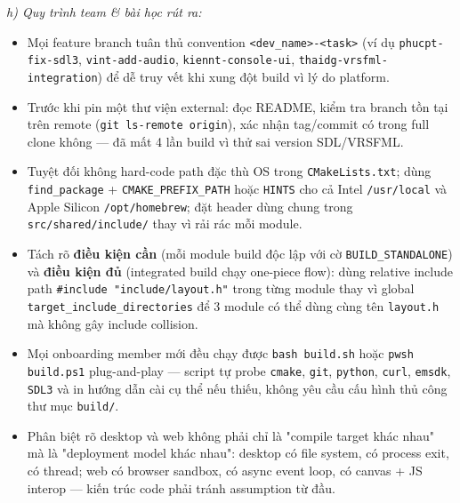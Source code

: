 \documentclass[12pt,a4paper]{article}
\begin{document}
\textit{h) Quy trình team \& bài học rút ra:}
\begin{itemize}
    \item Mọi feature branch tuân thủ convention \texttt{<dev\_name>-<task>} (ví dụ \texttt{phucpt-fix-sdl3}, \texttt{vint-add-audio}, \texttt{kiennt-console-ui}, \texttt{thaidg-vrsfml-integration}) để dễ truy vết khi xung đột build vì lý do platform.
    \item Trước khi pin một thư viện external: đọc README, kiểm tra branch tồn tại trên remote (\texttt{git ls-remote origin}), xác nhận tag/commit có trong full clone không — đã mất 4 lần build vì thử sai version SDL/VRSFML.
    \item Tuyệt đối không hard-code path đặc thù OS trong \texttt{CMakeLists.txt}; dùng \texttt{find\_package} + \texttt{CMAKE\_PREFIX\_PATH} hoặc \texttt{HINTS} cho cả Intel \texttt{/usr/local} và Apple Silicon \texttt{/opt/homebrew}; đặt header dùng chung trong \texttt{src/shared/include/} thay vì rải rác mỗi module.
    \item Tách rõ \textbf{điều kiện cần} (mỗi module build độc lập với cờ \texttt{BUILD\_STANDALONE}) và \textbf{điều kiện đủ} (integrated build chạy one-piece flow): dùng relative include path \texttt{\#include "include/layout.h"} trong từng module thay vì global \texttt{target\_include\_\allowbreak directories} để 3 module có thể dùng cùng tên \texttt{layout.h} mà không gây include collision.
    \item Mọi onboarding member mới đều chạy được \texttt{bash build.sh} hoặc \texttt{pwsh build.ps1} plug-and-play — script tự probe \texttt{cmake}, \texttt{git}, \texttt{python}, \texttt{curl}, \texttt{emsdk}, \texttt{SDL3} và in hướng dẫn cài cụ thể nếu thiếu, không yêu cầu cấu hình thủ công thư mục \texttt{build/}.
    \item Phân biệt rõ desktop và web không phải chỉ là "compile target khác nhau" mà là "deployment model khác nhau": desktop có file system, có process exit, có thread; web có browser sandbox, có async event loop, có canvas + JS interop — kiến trúc code phải tránh assumption từ đầu.
\end{itemize}

\label{LastPageTeamConflictSolving}
\end{document}
